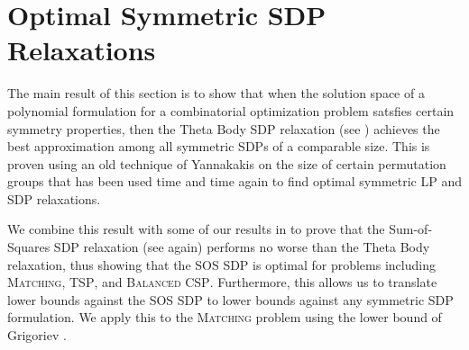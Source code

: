 \chapter{Optimal Symmetric SDP Relaxations}\label{cha:symmetric_sdps}
The main result of this section is to show that when the solution space of a polynomial formulation for a combinatorial optimization problem satsfies certain symmetry properties, then the Theta Body SDP relaxation (see ) achieves the best approximation among all symmetric SDPs of a comparable size. This is proven using an old technique of Yannakakis on the size of certain permutation groups that has been used time and time again to find optimal symmetric LP and SDP relaxations. 

We combine this result with some of our results in  to prove that the Sum-of-Squares SDP relaxation (see  again) performs no worse than the Theta Body relaxation, thus showing that the SOS SDP is optimal for problems including \textsc{Matching}, \textsc{TSP}, and \textsc{Balanced CSP}. Furthermore, this allows us to translate lower bounds against the SOS SDP to lower bounds against any symmetric SDP formulation. We apply this to the \textsc{Matching} problem using the lower bound of Grigoriev \cite{Gri01}.

